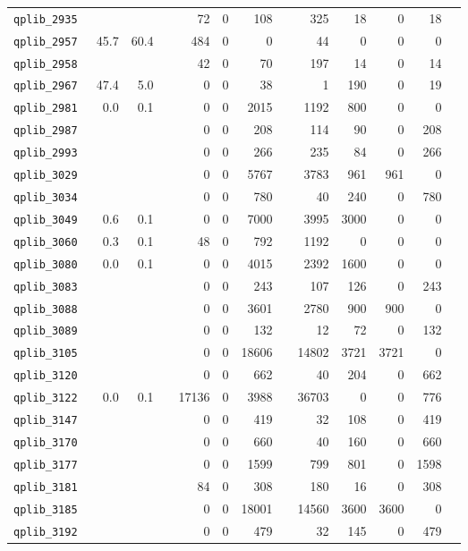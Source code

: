 {\begin{longtable}{lrrrrrrrrrrrr}
{\tt 	qplib\_2935	}	&		&		&	&	72	&	0	&	108	&	&	325	&	18	&	0	&	18	\\
{\tt 	qplib\_2957	}	&	45.7	&	60.4	&	&	484	&	0	&	0	&	&	44	&	0	&	0	&	0	\\
{\tt 	qplib\_2958	}	&		&		&	&	42	&	0	&	70	&	&	197	&	14	&	0	&	14	\\
{\tt 	qplib\_2967	}	&	47.4	&	5.0	&	&	0	&	0	&	38	&	&	1	&	190	&	0	&	19	\\
{\tt 	qplib\_2981	}	&	0.0	&	0.1	&	&	0	&	0	&	2015	&	&	1192	&	800	&	0	&	0	\\
{\tt 	qplib\_2987	}	&		&		&	&	0	&	0	&	208	&	&	114	&	90	&	0	&	208	\\
{\tt 	qplib\_2993	}	&		&		&	&	0	&	0	&	266	&	&	235	&	84	&	0	&	266	\\
{\tt 	qplib\_3029	}	&		&		&	&	0	&	0	&	5767	&	&	3783	&	961	&	961	&	0	\\
{\tt 	qplib\_3034	}	&		&		&	&	0	&	0	&	780	&	&	40	&	240	&	0	&	780	\\
{\tt 	qplib\_3049	}	&	0.6	&	0.1	&	&	0	&	0	&	7000	&	&	3995	&	3000	&	0	&	0	\\
{\tt 	qplib\_3060	}	&	0.3	&	0.1	&	&	48	&	0	&	792	&	&	1192	&	0	&	0	&	0	\\
{\tt 	qplib\_3080	}	&	0.0	&	0.1	&	&	0	&	0	&	4015	&	&	2392	&	1600	&	0	&	0	\\
{\tt 	qplib\_3083	}	&		&		&	&	0	&	0	&	243	&	&	107	&	126	&	0	&	243	\\
{\tt 	qplib\_3088	}	&		&		&	&	0	&	0	&	3601	&	&	2780	&	900	&	900	&	0	\\
{\tt 	qplib\_3089	}	&		&		&	&	0	&	0	&	132	&	&	12	&	72	&	0	&	132	\\
{\tt 	qplib\_3105	}	&		&		&	&	0	&	0	&	18606	&	&	14802	&	3721	&	3721	&	0	\\
{\tt 	qplib\_3120	}	&		&		&	&	0	&	0	&	662	&	&	40	&	204	&	0	&	662	\\
{\tt 	qplib\_3122	}	&	0.0	&	0.1	&	&	17136	&	0	&	3988	&	&	36703	&	0	&	0	&	776	\\
{\tt 	qplib\_3147	}	&		&		&	&	0	&	0	&	419	&	&	32	&	108	&	0	&	419	\\
{\tt 	qplib\_3170	}	&		&		&	&	0	&	0	&	660	&	&	40	&	160	&	0	&	660	\\
{\tt 	qplib\_3177	}	&		&		&	&	0	&	0	&	1599	&	&	799	&	801	&	0	&	1598	\\
{\tt 	qplib\_3181	}	&		&		&	&	84	&	0	&	308	&	&	180	&	16	&	0	&	308	\\
{\tt 	qplib\_3185	}	&		&		&	&	0	&	0	&	18001	&	&	14560	&	3600	&	3600	&	0	\\
{\tt 	qplib\_3192	}	&		&		&	&	0	&	0	&	479	&	&	32	&	145	&	0	&	479	\\

\end{longtable}}
